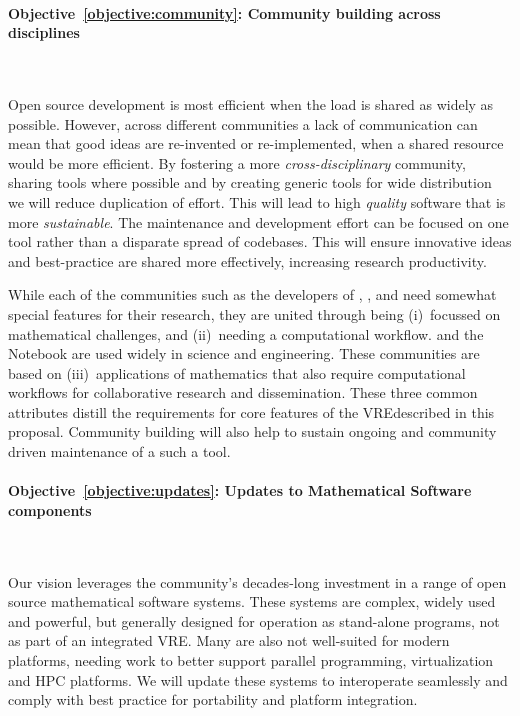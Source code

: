 \documentclass[noworkareas,deliverables,\classoptions]{euproposal}       %
\newcommand{\VREs}{VRE}
\begin{document}
\begin{proposal}
\paragraph{Objective~\ref{objective:community}: Community building across disciplines}\ 

Open source development is most efficient when the load is shared as
widely as possible. However, across different communities a lack of
communication can mean that good ideas are re-invented or
re-implemented, when a shared resource would be more efficient. By
fostering a more \emph{cross-disciplinary} community, sharing tools
where possible and by creating generic tools for wide distribution we
will reduce duplication of effort. This will lead to high
\emph{quality} software that is more \emph{sustainable}. The
maintenance and development effort can be focused on one tool rather
than a disparate spread of codebases. This will ensure innovative
ideas and best-practice are shared more effectively, increasing
research productivity.

While each of the communities such as the developers of \Sage,
\Singular, and \GAP need somewhat special features for their research,
they are united through being (i)~focussed on mathematical challenges,
and (ii)~needing a computational workflow. \IPython and the \Jupyter
Notebook are used widely in science and engineering. These communities
are based on (iii)~applications of mathematics that also require
computational workflows for collaborative research and
dissemination. These three common attributes distill the requirements
for core features of the \VREs described in this proposal. Community
building will also help to sustain ongoing and community driven
maintenance of a such a tool.



\paragraph{Objective~\ref{objective:updates}: Updates to Mathematical
  Software components}\

Our vision leverages the community's decades-long investment in a
range of open source mathematical software systems. These systems are
complex, widely used and powerful, but generally designed for
operation as stand-alone programs, not as part of an integrated
VRE. Many are also not well-suited for modern platforms, needing work
to better support parallel programming, virtualization and HPC
platforms. We will update these systems to interoperate seamlessly and
comply with best practice for portability and platform integration.



\end{proposal}
\end{document}

